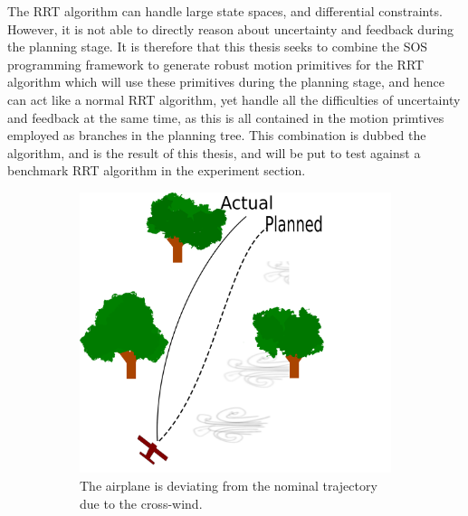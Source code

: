 The \ac{RRT} algorithm can handle large state spaces, and differential
constraints. However, it is not able to directly reason about uncertainty and
feedback during the planning stage. It is therefore that this thesis seeks to
combine the \ac{SOS} programming framework to generate robust motion primitives
for the \ac{RRT} algorithm which will use these primitives during the planning
stage, and hence can act like a normal \ac{RRT} algorithm, yet handle all the
difficulties of uncertainty and feedback at the same time, as this is all
contained in the motion primtives employed as branches in the planning tree.
This combination is dubbed the \rrtfunnel{} algorithm, and is the result of this
thesis, and will be put to test against a benchmark \ac{RRT} algorithm in the
experiment section.

\begin{figure}
  \begin{subfigure}{0.5\textwidth}
    \includegraphics[width=\textwidth]{figures/experiments/experiment-setup-no-funnel}
    \caption{The airplane is deviating from the nominal trajectory due to the
      cross-wind.}
  \end{subfigure}%
  \;
  \begin{subfigure}{0.5\textwidth}

\end{subfigure}
\end{figure}
